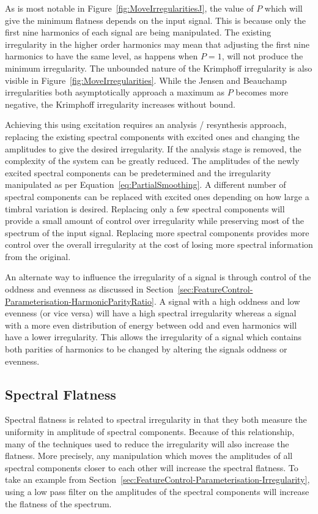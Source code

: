 		As is most notable in Figure~\ref{fig:MoveIrregularitiesJ}, the value of $P$ which will give the minimum
		flatness depends on the input signal. This is because only the first nine harmonics of each signal are
		being manipulated. The existing irregularity in the higher order harmonics may mean that adjusting the
		first nine harmonics to have the same level, as happens when $P = 1$, will not produce the minimum
		irregularity. The unbounded nature of the Krimphoff irregularity is also visible in
		Figure~\ref{fig:MoveIrregularities}.  While the Jensen and Beauchamp irregularities both asymptotically
		approach a maximum as $P$ becomes more negative, the Krimphoff irregularity increases without bound.

		Achieving this using excitation requires an analysis / resynthesis approach, replacing the existing
		spectral components with excited ones and changing the amplitudes to give the desired irregularity. If the
		analysis stage is removed, the complexity of the system can be greatly reduced. The amplitudes of the newly
		excited spectral components can be predetermined and the irregularity manipulated as per
		Equation~\ref{eq:PartialSmoothing}. A different number of spectral components can be replaced with excited
		ones depending on how large a timbral variation is desired. Replacing only a few spectral components will
		provide a small amount of control over irregularity while preserving most of the spectrum of the input
		signal. Replacing more spectral components provides more control over the overall irregularity at the cost
		of losing more spectral information from the original.

		An alternate way to influence the irregularity of a signal is through control of the oddness and evenness
		as discussed in Section~\ref{sec:FeatureControl-Parameterisation-HarmonicParityRatio}. A signal with a high
		oddness and low evenness (or vice versa) will have a high spectral irregularity whereas a signal with a
		more even distribution of energy between odd and even harmonics will have a lower irregularity. This allows
		the irregularity of a signal which contains both parities of harmonics to be changed by altering the
		signals oddness or evenness.

	\subsection{Spectral Flatness}
	\label{sec:FeatureControl-Parameterisation-Flatness}
		Spectral flatness is related to spectral irregularity in that they both measure the uniformity in amplitude
		of spectral components. Because of this relationship, many of the techniques used to reduce the
		irregularity will also increase the flatness. More precisely, any manipulation which moves the amplitudes
		of all spectral components closer to each other will increase the spectral flatness. To take an example
		from Section~\ref{sec:FeatureControl-Parameterisation-Irregularity}, using a low pass filter on the
		amplitudes of the spectral components will increase the flatness of the spectrum. 
		
